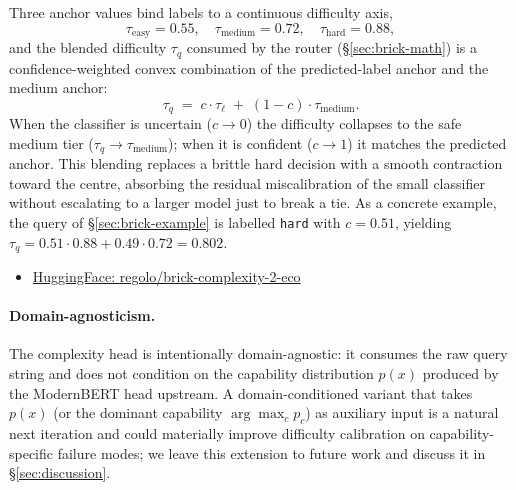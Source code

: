 \documentclass[twocolumn,10pt,a4paper]{article}
\begin{document}
Three anchor values bind labels to a continuous difficulty axis,
\[
  \tau_{\text{easy}}{=}0.55,\quad \tau_{\text{medium}}{=}0.72,\quad \tau_{\text{hard}}{=}0.88,
\]
and the blended difficulty $\tau_q$ consumed by the router (§\ref{sec:brick-math}) is a confidence-weighted convex combination of the predicted-label anchor and the medium anchor:
\[
  \tau_q \;=\; c\cdot\tau_{\ell} \;+\; (1-c)\cdot\tau_{\text{medium}}.
\]
When the classifier is uncertain ($c{\to}0$) the difficulty collapses to the safe medium tier ($\tau_q{\to}\tau_{\text{medium}}$); when it is confident ($c{\to}1$) it matches the predicted anchor. This blending replaces a brittle hard decision with a smooth contraction toward the centre, absorbing the residual miscalibration of the small classifier without escalating to a larger model just to break a tie. As a concrete example, the query of §\ref{sec:brick-example} is labelled \texttt{hard} with $c{=}0.51$, yielding $\tau_q = 0.51\cdot 0.88 + 0.49\cdot 0.72 = 0.802$.
\begin{itemize}[noitemsep,topsep=2pt,leftmargin=1em]
  \item \href{https://huggingface.co/regolo/brick-complexity-2-eco}{HuggingFace: regolo/brick-complexity-2-eco}
\end{itemize}

\paragraph{Domain-agnosticism.} The complexity head is intentionally domain-agnostic: it consumes the raw query string and does not condition on the capability distribution $p(x)$ produced by the ModernBERT head upstream. A domain-conditioned variant that takes $p(x)$ (or the dominant capability $\arg\max_c p_c$) as auxiliary input is a natural next iteration and could materially improve difficulty calibration on capability-specific failure modes; we leave this extension to future work and discuss it in §\ref{sec:discussion}.
\end{document}
